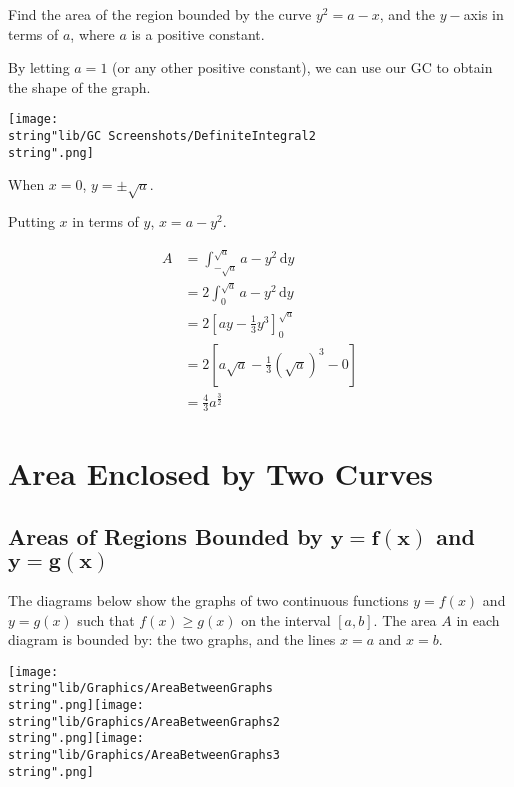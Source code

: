 \documentclass[11pt,a4paper]{book}
\begin{document}
\newpage

\begin{example}

Find the area of the region bounded by the curve $y^{2}=a-x$, and
the $y-$axis in terms of $a$, where $a$ is a positive constant.

\Solution

By letting $a=1$ (or any other positive constant), we can use our
GC to obtain the shape of the graph.
\begin{center}
\texttt{[image: \\string"lib/GC Screenshots/DefiniteIntegral2\\string".png]}
\par\end{center}

When $x=0$, $y=\pm\sqrt{a}$.

Putting $x$ in terms of $y$, $x=a-y^{2}$.

\begin{align*}
A & =\int_{-\sqrt{a}}^{\sqrt{a}}a-y^{2}\,\mathrm{d}y\\
 & =2\int_{0}^{\sqrt{a}}a-y^{2}\,\mathrm{d}y\\
 & =2\left[ay-\frac{1}{3}y^{3}\right]_{0}^{\sqrt{a}}\\
 & =2\left[a\sqrt{a}-\frac{1}{3}\left(\sqrt{a}\right)^{3}-0\right]\\
 & =\frac{4}{3}a^{\frac{3}{2}}
\end{align*}

\end{example}
\newpage

\section{Area Enclosed by Two Curves}

\subsection{Areas of Regions Bounded by $\boldsymbol{y=f\left(x\right)}$ and
$\boldsymbol{y=g\left(x\right)}$}

The diagrams below show the graphs of two continuous functions $y=f(x)$
and $y=g(x)$ such that $f(x)\geq g(x)$ on the interval $[a,b]$.
The area $A$ in each diagram is bounded by: the two graphs, and the
lines $x=a$ and $x=b$.

\texttt{[image: \\string"lib/Graphics/AreaBetweenGraphs\\string".png]}\hspace{1cm}\texttt{[image: \\string"lib/Graphics/AreaBetweenGraphs2\\string".png]}\hspace{1cm}\texttt{[image: \\string"lib/Graphics/AreaBetweenGraphs3\\string".png]}
\end{document}
